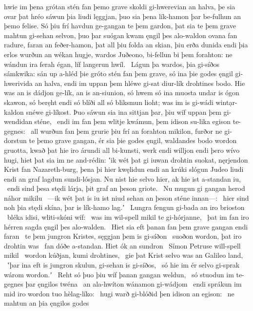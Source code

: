 hwie im þena grótan stén fan þemo grave skoldi
gi-hwerevian an halva, þe sia ovar þat hréo sáwun
þia liudi lęggjan, þuo sia þena lík-hamon þar
be-fulhun an þemo felise. Só þiu frí havdun
ge-gangan te þem gardon, þat sia te þem grave mahtun
gi-sehan selvon, þuo þar suógan kwam
ęngil þes alo-waldon ovana fan radure,
faran an feðer-hamon, þat all þiu folda an skian,
þiu erða dunida endi þia erlos wurðun
an wékan hugje, wardos Juðeono,
bi-fellun bi þem forahton: ne wándun ira ferah égan,
líf langerun hwíl. \hld\ Lágun þa wardos,
þia gi-síðos sámkwika: sán up a-hléd
þie gróto stén fan þem grave, só ina þie godes ęngil
gi-hwerivida an halva, endi im uppan þem hléwe gi-sat
diur-lík drohtines bodo. Hie was an is dádjon ge-lík,
an is an-siunion, só hwem só ina muosta undar is ógon skawon,
só berẹht endi só blíði all só bliksmun lioht;
was im is gi-wádi wintạr-kaldon
snéwe gi-líkost. Þuo sáwun sia ina sittjan þar,
þiu wíf uppan þem gi-wendidan sténe, \hld\ endi im fan þem wlitje kwámun,
þem idison su-lika egison te-gegnes: \hld\ all wurðun fan þem grurie
þiu frí an forahton mikilon, furðor ne gi-dorstun
te þemo grave gangan, ér sia þie godes ęngil,
waldandes bodo wordon gruotta,
kwað þat hie iro árundi all bi-kunsti,
werk endi willjon endi þero wívo hugi,
hiet þat sia im ne and-rédin: ʽik wét þat gi iuwan drohtin suokat,
nęrjendon Krist fan Nazareth-burg,
þena þi hier kwęlidun endi an krúki slógun
Judeo liudi endi an graf lagdun
sundi-lósjan. Nu nist hie selvo hier,
ak hie ist a-standan iu, \hld\ endi sind þesa stędi lárja, %
þit graf an þeson griote. \hld\ Nu mugun gi gangan herod
náhor mikilu \hld\ —ik wét þat is iu ist niud sehan
an þeson sténe innan—: \hld\ hier sind noh þia stędi skína,
þar is lík-hamo lag.ʼ \hld\ Lungra fengun
gi-bada an iro brioston \hld\ bléka idisi,
wliti-skóni wíf: \hld\ was im wil-spell mikil
te gi-hórjanne, \hld\ þat im fan iro hérren sagda
ęngil þes alo-walden. \hld\ Hiet sia eft þanan
fan þem grave gangan endi faran \hld\ te þem jungron Kristes,
sęggjan þem is gi-síðon \hld\ suoðon wordon,
þat iro drohtin was \hld\ fan dóðe a-standan.
Hiet ók an sundron \hld\ Símon Petruse
will-spell mikil \hld\ wordon kúðjan,
kumi drohtines, \hld\ gie þat Krist selvo
was an Galileo land, \hld\ ʽþar ina eft is jungron skulun,
gi-sehan is gi-síðos, \hld\ só hie im ér selvo gi-sprak
wárom wordon.ʼ \hld\ Reht só þuo þiu wíf þanan
gangan weldun, \hld\ só stuodun im te-gegnes þar
ęngilos twéna \hld\ an ala-hwíton
wánamon gi-wádjom \hld\ endi sprákun im mid iro wordon tuo
hèlag-líko: \hld\ hugi warð gi-blóðid
þen idison an egison: \hld\ ne mahtun an þia ęngilos godes
